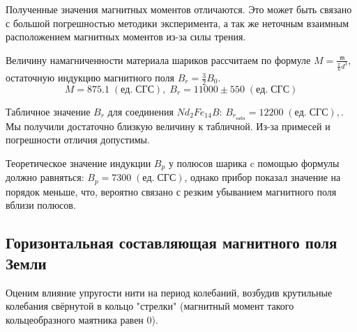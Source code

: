 \documentclass[a4paper,12pt]{article}
\begin{document}
Полученные значения магнитных моментов отличаются. Это может быть связано с большой погрешностью методики эксперимента, а так же неточным взаимным расположением магнитных моментов из-за силы трения.

Величину намагниченности материала шариков рассчитаем по формуле $M = \frac{\mathfrak{m}}{\frac{\pi}{6} d^3}$, остаточную индукцию магнитного поля $B_r = \frac32B_0$. $$M = 875.1 \; (ед. \; СГС), \; B_r = 11000 \pm 550 \; (ед. \; СГС)$$

Табличное значение $B_r$ для соединения $Nd_2Fe_{14}B$:
$B_{r_{табл}} = 12200 \; (ед. \; СГС),$. Мы получили достаточно близкую величину к табличной. Из-за примесей и погрешности отличия допустимы.

Теоретическое значение индукции $B_p$ у полюсов шарика c помощью формулы должно равняться:
$B_p = 7300 \; (ед. \; СГС)$, однако прибор показал значение на порядок меньше, что, вероятно связано с резким убыванием магнитного поля вблизи полюсов.

\subsection{Горизонтальная составляющая магнитного поля Земли}

Оценим влияние упругости нити на период колебаний, возбудив крутильные колебания свёрнутой в кольцо "стрелки" (магнитный момент такого кольцеобразного маятника равен 0).
\end{document}

